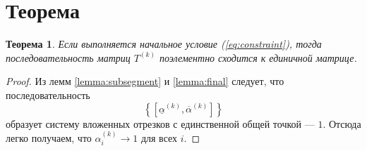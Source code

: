 \documentclass{article}
\newtheorem{theorem}{Теорема}
\newcommand{\ak}[1][k]{\alpha^{(#1)}}
\newcommand{\minak}[1][k]{\underline{\alpha}^{(#1)}}
\newcommand{\maxak}[1][k]{\overline{\alpha}^{(#1)}}
\newcommand{\Tk}[1][k]{T^{(#1)}}
\begin{document}
\section{Теорема}

\begin{theorem}
  Если выполняется начальное условие (\ref{eq:constraint}), тогда последовательность матриц $\Tk$ поэлементно сходится к единичной матрице.
\end{theorem}
\begin{proof}
  Из лемм \ref{lemma:subsegment} и \ref{lemma:final} следует, что последовательность 
  \[ \left\{ [ \minak, \maxak ] \right\} \]
  образует систему вложенных отрезков с единственной общей точкой — $1$.
  Отсюда легко получаем, что
  $\ak_i \rightarrow 1$ для всех $i.$

\end{proof}
\end{document}
